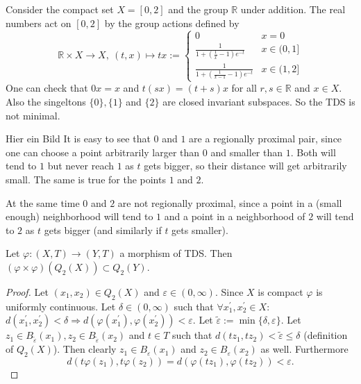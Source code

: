 \begin{example}
  Consider the compact set $X = [0, 2]$ and the group $\mathbb{R}$ under addition.
  The real numbers act on $[0, 2]$ by the group actions defined by
  \begin{equation*}
    \mathbb{R} \times X \to X, \ (t, x) \mapsto 
    tx := \begin{cases}
      0 & x = 0 \\
      \frac{1}{1 + (\frac{1}{x} - 1)e^{-t}} & x \in (0, 1] \\
      \frac{1}{1 + (\frac{1}{x - 1} - 1)e^{-t}} & x \in (1, 2]
    \end{cases}
  \end{equation*}
  One can check that $0x = x$ and $t(sx) = (t + s)x$ for all $r, s \in \mathbb{R}$ and $x \in X$.
  Also the singeltons $\{ 0 \}, \{ 1 \}$ and $\{ 2 \}$ are closed invariant subspaces.
  So the TDS is not minimal.

  {\color{red} Hier ein Bild}
  It is easy to see that $0$ and $1$ are a regionally proximal pair,
  since one can choose a point arbitrarily larger than $0$ and smaller than $1$.
  Both will tend to $1$ but never reach $1$ as $t$ gets bigger,
  so their distance will get arbitrarily small.
  The same is true for the points $1$ and $2$.

  At the same time $0$ and $2$ are not regionally proximal,
  since a point in a (small enough) neighborhood will tend to $1$ and a point in a neighborhood of $2$ will tend to $2$ as $t$ gets bigger
  (and similarly if $t$ gets smaller).
\end{example}
\begin{proposition}
  \label{prop:phiSqQ2XcQ2Y}
  Let $\varphi : (X,T) \to (Y,T)$ a morphism of TDS. Then $(\varphi \times \varphi) (Q_2 (X)) \subset Q_2(Y)$.
\end{proposition}
\begin{proof}
  Let $(x_1, x_2) \in Q_2(X)$ and $\varepsilon \in (0,\infty)$.
  Since $X$ is compact $\varphi$ is uniformly continuous.
  Let $\delta \in (0, \infty)$ such that $\forall x_1^\prime, x_2^\prime \in X:$ $d(x_1^\prime, x_2^\prime)<\delta \Rightarrow d(\varphi (x_1^\prime), \varphi(x_2^\prime)) < \varepsilon$.
  Let $\tilde{\varepsilon} := \min \{\delta, \varepsilon\}$.
  Let $z_1 \in B_{\tilde{\varepsilon}} (x_1), z_2 \in  B_{\tilde{\varepsilon}}(x_2)$ and $t \in T$ such that $d(t z_1, tz_2) < \tilde{\varepsilon} \leq \delta$ (definition of $Q_2(X)$).
  Then clearly $z_1 \in B_\varepsilon (x_1)$ and $z_2 \in B_\varepsilon  (x_2)$ as well.
  Furthermore
  \begin{equation*}
    d(t \varphi (z_1), t\varphi(z_2)) = d (\varphi ( t z_1) , \varphi (t z_2)) < \varepsilon.
  \end{equation*}
\end{proof}


